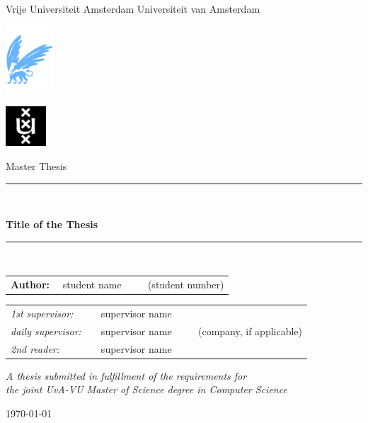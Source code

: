\documentclass[twoside,11pt]{Latex/Classes/PhDthesisPSnPDF}
\begin{document}
\thispagestyle{empty}

\begin{center}

Vrije Universiteit Amsterdam \hspace*{2cm} Universiteit van Amsterdam

\vspace{1mm}

\hspace*{-7.5cm}\includegraphics[height=25mm]{vu-griffioen.pdf}

\vspace*{-2cm}\hspace*{7.5cm}\includegraphics[height=15mm]{uva_logo.jpg}

\vspace{2cm}

{\Large Master Thesis}

\vspace*{1.5cm}

\rule{.9\linewidth}{.6pt}\\[0.4cm]
{\huge \bfseries Title of the Thesis\par}\vspace{0.4cm}
\rule{.9\linewidth}{.6pt}\\[1.5cm]

\vspace*{2mm}

{\Large
\begin{tabular}{l}
{\bf Author:} ~~student name ~~~~ (student number)
\end{tabular}
}

\vspace*{2cm}

\begin{tabular}{ll}
{\it 1st supervisor:}   & ~~supervisor name \\
{\it daily supervisor:} & ~~supervisor name ~~~~ (company, if applicable) \\
{\it 2nd reader:}       & ~~supervisor name
\end{tabular}

\vspace*{2.5cm}

\textit{A thesis submitted in fulfillment of the requirements for\\ the joint UvA-VU Master of Science degree in Computer Science}

\vspace*{1.8cm}

\today\\[4cm] %

\end{center}
\end{document}
